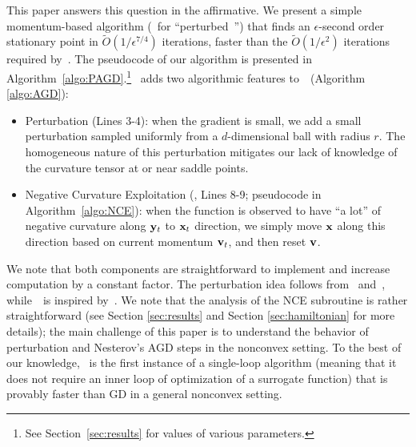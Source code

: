 This paper answers this question in the affirmative. We present a simple momentum-based algorithm (\pagd~for ``perturbed~\nag'') that finds an $\epsilon$-second order stationary point in $\tilde{O}(1/\epsilon^{7/4})$ iterations, faster than the $\tilde{O}(1/\epsilon^{2})$ iterations required by~\gd.
The pseudocode of our algorithm is presented in Algorithm~\ref{algo:PAGD}.\footnote{See Section~\ref{sec:results} for values of various parameters.}
\pagd~adds two algorithmic features to~\nag~(Algorithm \ref{algo:AGD}):
\begin{itemize}
\item Perturbation (Lines 3-4): when the gradient is small, we add a small perturbation sampled uniformly from a $d$-dimensional ball with radius $r$.
The homogeneous nature of this perturbation mitigates our lack of knowledge of the curvature tensor
at or near saddle points.
\item Negative Curvature Exploitation (\nce, Lines 8-9; pseudocode in Algorithm~\ref{algo:NCE}):
when the function is observed to have ``a lot'' of negative curvature along $\mathbf{y}_t$ to $\mathbf{x}_t$ direction, we simply move $\mathbf{x}$ along this direction based on current momentum $\mathbf{v}_t$, and then reset $\mathbf{v}$.
\end{itemize}
We note that both components are straightforward to implement and increase computation by a constant factor. 
The perturbation idea follows from~\cite{ge2015escaping} and~\cite{jin2017escape}, while~\nce~is 
inspired by~\citet{carmon2017convex}.
We note that the analysis of the NCE subroutine is rather straightforward (see Section \ref{sec:results} and Section \ref{sec:hamiltonian} for more details); the main challenge of this paper is to understand the behavior of perturbation and Nesterov's AGD steps in the nonconvex setting.
To the best of our knowledge, \pagd~is the first instance of a single-loop 
algorithm (meaning that it does not require an inner loop of optimization of 
a surrogate function) that is provably faster than GD in a general nonconvex setting.

